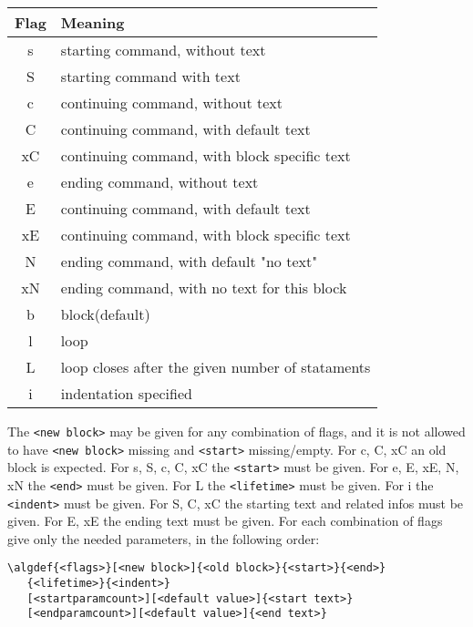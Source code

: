 \documentclass{article}
\begin{document}
\begin{minipage}[b]{0.5\linewidth}
\begin{minipage}[b]{0.5\linewidth}
\begin{minipage}[b]{0.5\linewidth}
\begin{minipage}[b]{0.5\linewidth}
\begin{minipage}[b]{0.5\linewidth}
\begin{minipage}[b]{0.5\linewidth}
\begin{minipage}[b]{0.5\linewidth}
\begin{center}
\begin{tabular}{|c|l|}
\hline
\textbf{Flag}&\textbf{Meaning}\\
\hline
s&starting command, without text\\
S&starting command with text\\
c&continuing command, without text\\
C&continuing command, with default text\\
xC&continuing command, with block specific text\\
\hline
e&ending command, without text\\
E&continuing command, with default text\\
xE&continuing command, with block specific text\\
N&ending command, with default "no text"\\
xN&ending command, with no text for this block\\
\hline
b&block(default)\\
l&loop\\
L&loop closes after the given number of stataments\\
\hline
i&indentation specified\\
\hline
\end{tabular}
\end{center}

The \verb:<new block>: may be given for any combination of flags, and it is not allowed to have
\verb:<new block>: missing and \verb:<start>: missing/empty.
For c, C, xC an old block is expected. For s, S, c, C, xC the \verb:<start>: must be given.
For e, E, xE, N, xN the \verb:<end>: must be given. For L the \verb:<lifetime>: must be given. 
For i the \verb:<indent>: must be given.
For S, C, xC the starting text and related infos must be given. For E, xE the ending text must be given.
For each combination of flags give only the needed parameters, in the following order:

\begin{verbatim}
\algdef{<flags>}[<new block>]{<old block>}{<start>}{<end>}
   {<lifetime>}{<indent>}
   [<startparamcount>][<default value>]{<start text>}
   [<endparamcount>][<default value>]{<end text>}
\end{verbatim}


\end{minipage}
\end{minipage}
\end{minipage}
\end{minipage}
\end{minipage}
\end{minipage}
\end{minipage}
\end{document}
